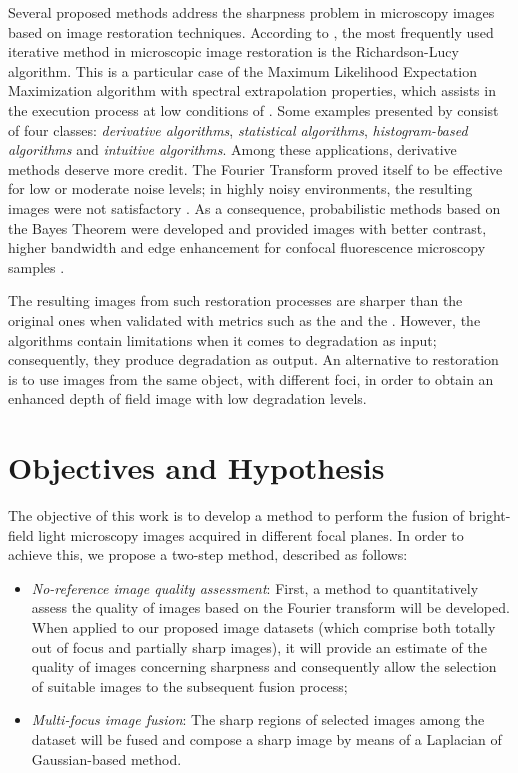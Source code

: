 Several proposed methods address the sharpness problem in microscopy images based on image restoration techniques. According to , the most frequently used iterative method in microscopic image restoration is the Richardson-Lucy algorithm. This is a particular case of the Maximum Likelihood Expectation Maximization algorithm with spectral extrapolation properties, which assists in the execution process at low conditions of . Some examples presented by  consist of
four classes: \emph{derivative algorithms}, \emph{statistical algorithms}, \emph{histogram-based algorithms} and \emph{intuitive algorithms}. Among these applications, derivative methods deserve more credit. The Fourier Transform proved itself to be
effective for low or moderate noise levels; in highly noisy environments, the resulting images were not satisfactory \cite{richardson1972bayesian}. As a consequence, probabilistic methods based on the Bayes Theorem were developed and provided images with better contrast, higher bandwidth and
edge enhancement for confocal fluorescence microscopy samples \cite{ponti2016image}.

The resulting images from such restoration processes are sharper than the original ones when validated with metrics such as the  and the . However, the algorithms contain limitations when it comes to degradation as input; consequently, they produce degradation as output. An alternative to restoration is to use images from the same object, with different foci, in order to obtain an enhanced depth of field image with low degradation levels.

\section{Objectives and Hypothesis}

The objective of this work is to develop a method to perform the fusion of bright-field light microscopy images acquired in different focal planes. In order to achieve this, we propose a two-step method, described as follows:

\begin{itemize}
    \item \emph{No-reference image quality assessment}: First, a method to quantitatively assess the quality of images based on the Fourier transform will be developed. When applied to our proposed image datasets (which comprise both totally out of focus and partially sharp images), it will provide an estimate of the quality of images concerning sharpness and consequently allow the selection of suitable images to the subsequent fusion process;
    
    \item \emph{Multi-focus image fusion}: The sharp regions of selected images among the dataset will be fused and compose a sharp image by means of a Laplacian of Gaussian-based method.
    
\end{itemize}

